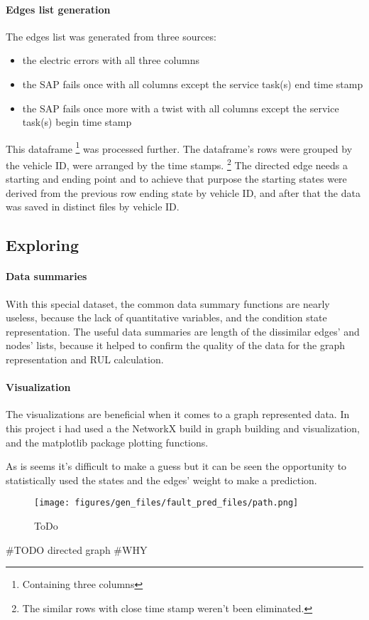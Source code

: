 \paragraph{Edges list generation}
The edges list was generated from three sources: 
\begin{itemize}
	\item{the electric errors} with all three columns
	\item{the SAP fails once} with all columns except the service task(s) end time stamp
	\item{the SAP fails once more with a twist} with all columns except the service task(s) begin time stamp
\end{itemize}

This dataframe \footnote{Containing three columns} was processed further. The dataframe's rows were grouped by the vehicle ID, were arranged by the time stamps.
\footnote{The similar rows with close time stamp weren't been eliminated.}
The directed edge needs a starting and ending point and to achieve that purpose the starting states were derived from the previous row ending state by vehicle ID, and after that the data was saved in distinct files by vehicle ID.
	\subsection{Exploring}
		\paragraph{Data summaries}
		With this special dataset, the common data summary functions are nearly useless, because the lack of quantitative variables, and the condition state representation.
		The useful data summaries are length of the dissimilar edges' and nodes' lists, because it helped to confirm the quality of the data for the graph representation and RUL calculation. 

		\paragraph{Visualization}
		The visualizations are beneficial when it comes to a graph represented data. In this project i had used a the NetworkX build in graph building and visualization, and the matplotlib package plotting functions.

		As is seems it's difficult to make a guess but it can be seen the opportunity to statistically used the states and the edges' weight to make a prediction.
			\begin{figure}[H]
			\centering
			\texttt{[image: figures/gen\_files/fault\_pred\_files/path.png]}
			\caption{ToDo} 
			\end{figure}
		\#TODO directed graph
\#WHY

